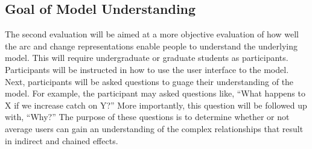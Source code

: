 \subsection{Goal of Model Understanding}

The second evaluation will be aimed at a more objective evaluation of how well the arc and change representations enable people to understand the underlying model.  This will require undergraduate or graduate students as participants.  Participants will be instructed in how to use the user interface to the model.  Next, participants will be asked questions to guage their understanding of the model.  For example, the participant may asked questions like, ``What happens to X if we increase catch on Y?''  More importantly, this question will be followed up with, ``Why?''  The purpose of these questions is to determine whether or not average users can gain an understanding of the complex relationships that result in indirect and chained effects.
